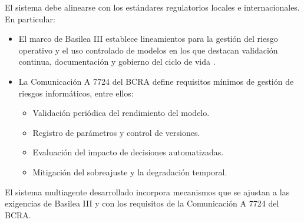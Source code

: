 El sistema debe alinearse con los estándares regulatorios locales e internacionales. En particular:

\begin{itemize}
    \item El {marco de Basilea III} establece lineamientos para la gestión del riesgo operativo y el uso controlado de modelos en los que destacan validación continua, documentación y gobierno del ciclo de vida \parencite{basileaIII}.

    \item La {Comunicación A 7724 del BCRA} \parencite{bcra7724}
 define requisitos mínimos de gestión de riesgos informáticos, entre ellos:
    \begin{itemize}
        \item Validación periódica del rendimiento del modelo.
        \item Registro de parámetros y control de versiones.
        \item Evaluación del impacto de decisiones automatizadas.
        \item Mitigación del sobreajuste y la degradación temporal.
    \end{itemize}
\end{itemize}

El sistema multiagente desarrollado incorpora mecanismos que se ajustan a las exigencias de Basilea III y con los requisitos de la Comunicación A 7724 del BCRA.
